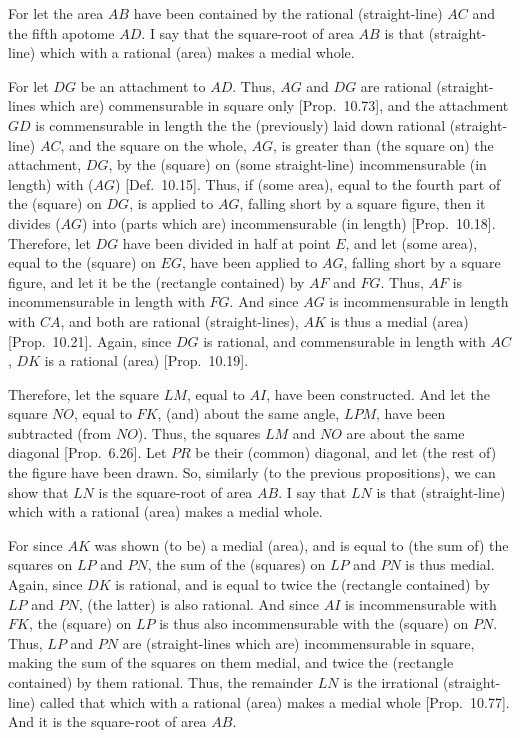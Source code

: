 \epsfysize=1.3in
\centerline{}

For let the area $AB$ have been contained by the rational (straight-line)
$AC$ and the fifth apotome $AD$. I say that the square-root of area $AB$
is  that (straight-line) which with a rational (area) makes a medial whole.

For let $DG$ be an attachment to $AD$. Thus, $AG$ and $DG$ are rational (straight-lines which are) commensurable in square only [Prop.~10.73], and the attachment $GD$ is
commensurable in length the the (previously) laid down rational (straight-line) $AC$, and the square on the whole, $AG$, is greater than (the square on)
the attachment, $DG$, by the (square) on (some straight-line)
incommensurable (in length) with ($AG$) [Def.~10.15]. 
Thus, if (some area), equal to the fourth part of the (square) on $DG$,
is applied to $AG$, falling short by a square figure, then it divides ($AG$)
into (parts which are) incommensurable (in length) [Prop.~10.18]. Therefore, let $DG$
have been divided in half at point $E$, and let (some area), equal to the
(square) on $EG$, have been applied to $AG$, falling short by a
square figure, and let it be the (rectangle contained) by $AF$ and $FG$.
Thus, $AF$ is incommensurable in length with $FG$. And since
$AG$ is incommensurable in length with $CA$, and both are
rational (straight-lines), $AK$ is thus a medial (area) [Prop.~10.21]. Again, since $DG$ is rational,
and commensurable in length with $AC$, $DK$ is a rational (area)
[Prop.~10.19].

Therefore, let the square $LM$, equal to $AI$, have been constructed. 
And let the square $NO$, equal to $FK$, (and) about the same angle, $LPM$,
have been subtracted (from $NO$). Thus, the squares $LM$ and
$NO$ are about the same diagonal [Prop.~6.26]. 
Let $PR$ be their (common) diagonal, and let (the rest of) the figure have been drawn.
So, similarly (to the previous propositions), we can show that $LN$ is the square-root of area $AB$.
I say that $LN$ is that (straight-line) which with a rational (area) makes a medial whole.

For since $AK$ was shown (to be) a medial (area), and is equal to (the sum of) the squares on $LP$ and $PN$, the sum of the (squares) on $LP$
and $PN$ is thus medial. Again, since $DK$ is rational, and
is equal to twice the (rectangle contained) by $LP$ and $PN$,  (the latter) is also
rational. And since $AI$ is incommensurable with $FK$, the (square) on
$LP$ is thus also incommensurable with the (square) on $PN$. Thus,
$LP$ and $PN$ are (straight-lines which are) incommensurable in square, making the
sum of the squares on them medial, and twice the (rectangle contained) by
them rational. Thus, the remainder $LN$ is the irrational (straight-line)
called that which with a rational (area) makes a medial whole [Prop.~10.77].
And it is the square-root of area $AB$.

